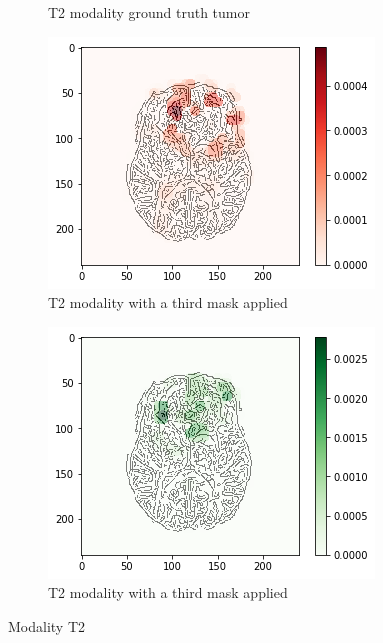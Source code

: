 \begin{figure}[H]
\begin{subfigure}[t]{.4\textwidth}
        \caption{T2 modality ground truth tumor}
    \end{subfigure}
    \begin{subfigure}[t]{.45\textwidth}
        \centering
        \includegraphics[width=\linewidth]{chapters/06_hdm/c_Brats18_2013_17_1_L1/53.png}
        \caption{T2 modality with a third mask applied}
    \end{subfigure}\hspace{1cm}%
    \begin{subfigure}[t]{.45\textwidth}
        \centering
        \includegraphics[width=\linewidth]{chapters/06_hdm/c_Brats18_2013_17_1_L1/54.png}
        \caption{T2 modality with a third mask applied}
    \end{subfigure}
    \caption{Modality T2}
\end{figure}


